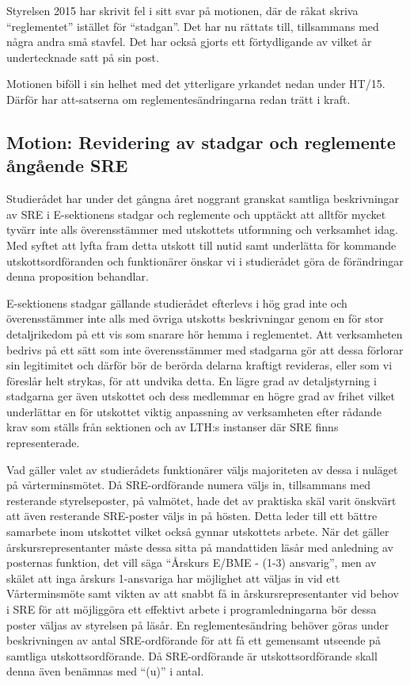 \documentclass[../_main/handlingar.tex]{subfiles}
\begin{document}
\begin{itshape}
Styrelsen 2015 har skrivit fel i sitt svar på motionen, där de råkat skriva ``reglementet'' istället för ``stadgan''. Det har nu rättats till, tillsammans med några andra små stavfel. Det har också gjorts ett förtydligande av vilket år undertecknade satt på sin post.

Motionen biföll i sin helhet med det ytterligare yrkandet nedan under HT/15. Därför har att-satserna om reglementesändringarna redan trätt i kraft.
\end{itshape}

\subsection*{Motion: Revidering av stadgar och reglemente ångående SRE}

Studierådet har under det gångna året noggrant granskat samtliga beskrivningar av SRE i E-sektionens stadgar och reglemente och upptäckt att alltför mycket tyvärr inte alls överensstämmer med utskottets utformning och verksamhet idag. Med syftet att lyfta fram detta utskott till nutid samt underlätta för kommande utskottsordföranden och funktionärer önskar vi i studierådet göra de förändringar denna proposition behandlar.

E-sektionens stadgar gällande studierådet efterlevs i hög grad inte och överensstämmer inte alls med övriga utskotts beskrivningar genom en för stor detaljrikedom på ett vis som snarare hör hemma i reglementet. Att verksamheten bedrivs på ett sätt som inte överensstämmer med stadgarna gör att dessa förlorar sin legitimitet och därför bör de berörda delarna kraftigt revideras, eller som vi föreslår helt strykas, för att undvika detta. En lägre grad av detaljstyrning i stadgarna ger även utskottet och dess medlemmar en högre grad av frihet vilket underlättar en för utskottet viktig anpassning av verksamheten efter rådande krav som ställs från sektionen och av LTH:s instanser där SRE finns representerade.

Vad gäller valet av studierådets funktionärer väljs majoriteten av dessa i nuläget på vårterminsmötet. Då SRE-ordförande numera väljs in, tillsammans med resterande styrelseposter, på valmötet, hade det av praktiska skäl varit önskvärt att även resterande SRE-poster väljs in på hösten. Detta leder till ett bättre samarbete inom utskottet vilket också gynnar utskottets arbete. När det gäller årskursrepresentanter måste dessa sitta på mandattiden läsår med anledning av posternas funktion, det vill säga ``Årskurs E/BME - (1-3) ansvarig'', men av skälet att inga årskurs 1-ansvariga har möjlighet att väljas in vid ett Vårterminsmöte samt vikten av att snabbt få in årskursrepresentanter vid behov i SRE för att möjliggöra ett effektivt arbete i programledningarna bör dessa poster väljas av styrelsen på läsår. En reglementesändring behöver göras under beskrivningen av antal SRE-ordförande för att få ett gemensamt utseende på samtliga utskottsordförande. Då SRE-ordförande är utskottsordförande skall denna även benämnas med ``(u)'' i antal.
\end{document}
